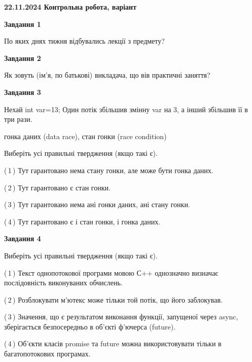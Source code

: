 \documentclass[12pt, ukrainian]{article}
\begin{document}
\begin {large}

\textbf{22.11.2024 Контрольна робота, варіант  }\par


{

\begin{center}
\textbf{Завдання 1}
\end{center}

По яких днях тижня відбувались лекції з предмету?


\begin{center}
\textbf{Завдання 2}
\end{center}

Як зовуть (ім'я, по батькові) викладача, що вів практичні заняття?


\begin{center}
\textbf{Завдання 3}
\end{center}

Нехай int var=13; Один потік збільшив змінну var на 3, а інший збільшив її в три рази.

гонка даних (data race), стан гонки (race condition)

Виберіть усі правильні твердження (якщо такі є).\par
\vspace{2mm}
(\,1\,) Тут гарантовано нема стану гонки, але може бути гонка даних.%

(\,2\,) Тут гарантовано є стан гонки.%

(\,3\,) Тут гарантовано нема ані гонки даних, ані стану гонки.%

(\,4\,) Тут гарантовано є і стан гонки, і гонка даних.%


\begin{center}
\textbf{Завдання 4}
\end{center}

Виберіть усі правильні твердження (якщо такі є).\par
\vspace{2mm}

(\,1\,) Текст однопотокової програми мовою С++ однозначно визначає послідовність виконуваних обчислень.%

(\,2\,) Розблокувати м’ютекс може тільки той потік, що його заблокував.%

(\,3\,) Значення, що є результатом виконання функції, запущеної через async, зберігається безпосередньо в об’єкті ф’ючерса (future).%

(\,4\,) Об’єкти класів promise та future можна використовувати тільки в багатопотокових програмах.%


}
\end{large}
\end{document}
